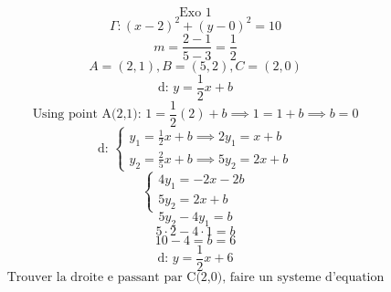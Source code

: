 \documentclass{article}
\begin{document}
\[\text{Exo 1}\]
\[ \Gamma: (x-2)^2 + (y-0)^2 = 10 \]
\[ m = \frac{2-1}{5-3} = \frac{1}{2} \]
\[ A=(2,1), B=(5,2), C=(2,0) \]
\[ \text{d: } y = \frac{1}{2}x + b \]
\[ \text{Using point A(2,1): } 1 = \frac{1}{2}(2) + b \implies 1 = 1 + b \implies b = 0 \]
\[ \text{d: }  \begin{cases} y_1 = \frac{1}{2}x + b \implies 2y_1 = x + b \\ y_2 = \frac{2}{5}x + b \implies 5y_2 = 2x + b \end{cases}\]
\[ \begin{cases} 4y_1 = -2x - 2b \\ 5y_2 = 2x + b \end{cases} \]
\[ 5y_2 - 4y_1 = b \]
\[ 5 \cdot 2 - 4 \cdot 1 = b \]
\[ 10 - 4 = b = 6 \]
\[ \text{d: } y = \frac{1}{2}x + 6 \]
\[\text{Trouver la droite e passant par C(2,0), faire un systeme d'equation}\]
\end{document}
